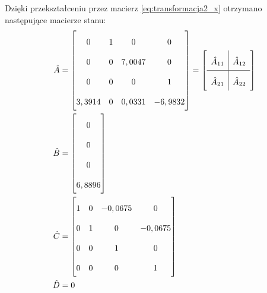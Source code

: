 Dzięki przekształceniu przez macierz \eqref{eq:transformacja2_x} otrzymano następujące macierze stanu:
\begin{align}
    \hat{A} &= \begin{bmatrix}
    0 & 1 & 0 & 0 \\
    0 & 0 & 7,0047 & 0 \\
    0 & 0 & 0 & 1 \\
    3,3914 & 0 & 0,0331 & -6,9832 \\
    \end{bmatrix}
    =
    \renewcommand\arraystretch{2}
    \left[
        \begin{array}{c|c}
        \hat{A}_{11} & \hat{A}_{12} \\
        \hline
        \hat{A}_{21} & \hat{A}_{22}
        \end{array}
    \right] \nonumber \\
    \hat{B} &= \begin{bmatrix}
    0 \\
    0 \\
    0 \\
    6,8896 \\
    \end{bmatrix} \nonumber \\
    \hat{C} &= \begin{bmatrix}
    1 & 0 & -0,0675 & 0 \\
    0 & 1 & 0 & -0,0675 \\
    0 & 0 & 1 & 0 \\
    0 & 0 & 0 & 1 \\
    \end{bmatrix} \nonumber \\
    \hat{D} &= 0 \label{eq:macierze_stanu3}
\end{align}

